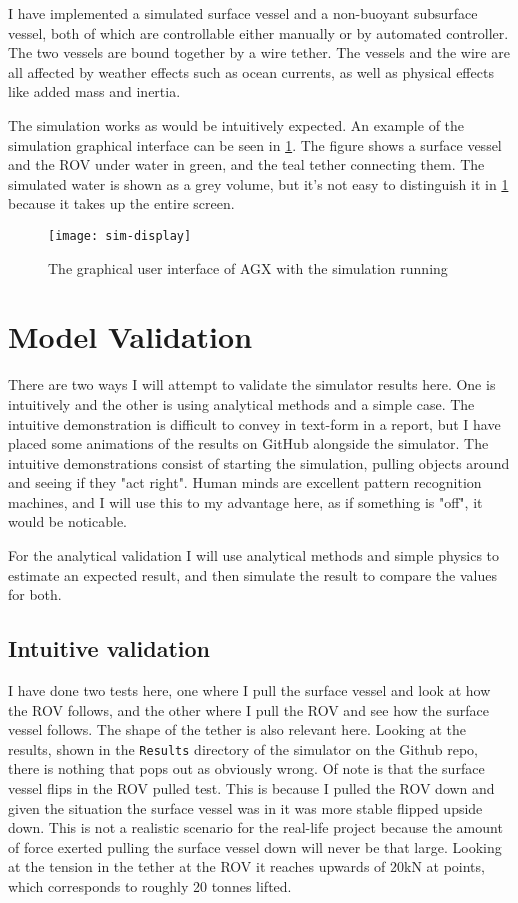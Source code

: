 I have implemented a simulated surface vessel and a non-buoyant subsurface vessel, both of which are controllable either manually or by automated controller. The two vessels are bound together by a wire tether. The vessels and the wire are all affected by weather effects such as ocean currents, as well as physical effects like added mass and inertia. 

The simulation works as would be intuitively expected. An example of the simulation graphical interface can be seen in \cref{fig:sim-display}. The figure shows a surface vessel and the ROV under water in green, and the teal tether connecting them. The simulated water is shown as a grey volume, but it's not easy to distinguish it in \cref{fig:sim-display} because it takes up the entire screen. 

\begin{figure}
	\centering
	\texttt{[image: sim-display]}
	\caption{The graphical user interface of AGX with the simulation running}
	\label{fig:sim-display}
\end{figure}

\section{Model Validation}
\label{sec:validation}
There are two ways I will attempt to validate the simulator results here. One is intuitively and the other is using analytical methods and a simple case. The intuitive demonstration is difficult to convey in text-form in a report, but I have placed some animations of the results on GitHub\cite{noauthor_fordypogmastersimulator_nodate} alongside the simulator. The intuitive demonstrations consist of starting the simulation, pulling objects around and seeing if they "act right". Human minds are excellent pattern recognition machines, and I will use this to my advantage here, as if something is "off", it would be noticable. 

For the analytical validation I will use analytical methods and simple physics to estimate an expected result, and then simulate the result to compare the values for both.

\subsection{Intuitive validation}
I have done two tests here, one where I pull the surface vessel and look at how the ROV follows, and the other where I pull the ROV and see how the surface vessel follows. The shape of the tether is also relevant here. Looking at the results, shown in the \texttt{Results} directory of the simulator on the Github repo, there is nothing that pops out as obviously wrong. Of note is that the surface vessel flips in the ROV pulled test. This is because I pulled the ROV down and given the situation the surface vessel was in it was more stable flipped upside down. This is not a realistic scenario for the real-life project because the amount of force exerted pulling the surface vessel down will never be that large. Looking at the tension in the tether at the ROV it reaches upwards of 20kN at points, which corresponds to roughly 20 tonnes lifted.

